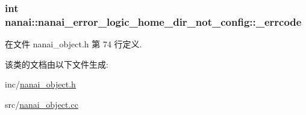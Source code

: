 \subsubsection[{\+\_\+errcode}]{\setlength{\rightskip}{0pt plus 5cm}int nanai\+::nanai\+\_\+error\+\_\+logic\+\_\+home\+\_\+dir\+\_\+not\+\_\+config\+::\+\_\+errcode}\label{classnanai_1_1nanai__error__logic__home__dir__not__config_a9bda795d3a757430411d101bbf9a2df4}


在文件 nanai\+\_\+object.\+h 第 74 行定义.



该类的文档由以下文件生成\+:\begin{DoxyCompactItemize}
\item 
inc/\hyperlink{nanai__object_8h}{nanai\+\_\+object.\+h}\item 
src/\hyperlink{nanai__object_8cc}{nanai\+\_\+object.\+cc}\end{DoxyCompactItemize}
